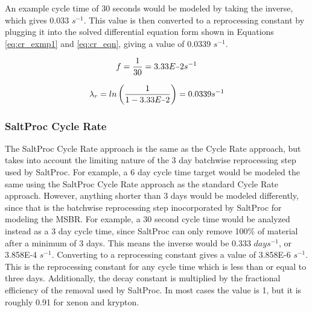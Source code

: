 


An example cycle time of 30 seconds would be modeled by taking the inverse, which gives 0.033 $s^{-1}$. This value is then converted to a reprocessing constant by plugging it into the solved differential equation form shown in Equations \eqref{eq:cr_exmp1} and \eqref{eq:cr_eqn}, giving a value of 0.0339 $s^{-1}$.

\begin{equation} \hfill
f = \frac{1}{30} = 3.33E\minus2 s^{-1}
\hfill\label{eq:cr_exmp1} \end{equation}

\begin{equation} \hfill
\lambda_{r} = ln\left(\frac{1}{1 - 3.33E\minus2}\right) = 0.0339 s^{-1}
\hfill\label{eq:cr_eqn} \end{equation}



\subsubsection{SaltProc Cycle Rate}

The SaltProc Cycle Rate approach is the same as the Cycle Rate approach, but takes into account the limiting nature of the 3 day batchwise reprocessing step used by SaltProc. For example, a 6 day cycle time target would be modeled the same using the SaltProc Cycle Rate approach as the standard Cycle Rate approach. However, anything shorter than 3 days would be modeled differently, since that is the batchwise reprocessing step inocorporated by SaltProc for modeling the MSBR. For example, a 30 second cycle time would be analyzed instead as a 3 day cycle time, since SaltProc can only remove 100\% of material after a minimum of 3 days. This means the inverse would be 0.333 $days^{-1}$, or 3.858E-4 $s^{-1}$. Converting to a reprocessing constant gives a value of 3.858E-6 $s^{-1}$. This is the reprocessing constant for any cycle time which is less than or equal to three days. Additionally, the decay constant is multiplied by the fractional efficiency of the removal used by SaltProc. In most cases the value is 1, but it is roughly 0.91 for xenon and krypton.


